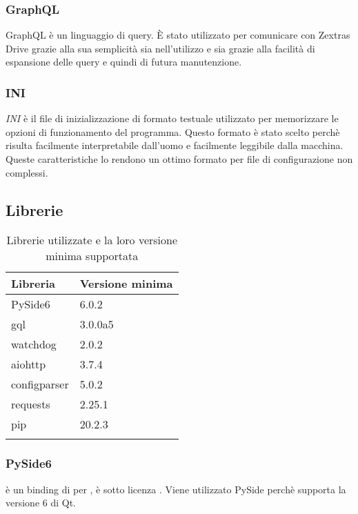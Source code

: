 {\subsubsection{GraphQL}
GraphQL è un linguaggio di query. È stato utilizzato per comunicare con Zextras Drive grazie alla sua semplicità sia nell'utilizzo e sia grazie alla facilità di espansione delle query e quindi di futura manutenzione.
\subsubsection{INI}
\textit{INI} è il file di inizializzazione di formato testuale utilizzato per memorizzare le opzioni di funzionamento del programma. Questo formato è stato scelto perchè risulta facilmente interpretabile dall'uomo e facilmente leggibile dalla macchina. Queste caratteristiche lo rendono un ottimo formato per file di configurazione non complessi.

\subsection{Librerie}

{
	\setlength{\freewidth}{\dimexpr\textwidth-1\tabcolsep}
	\renewcommand{\arraystretch}{1.5}
	\setlength{\aboverulesep}{0pt}
	\setlength{\belowrulesep}{0pt}
	\begin{longtable}{L{.210\freewidth} L{.68\freewidth}}
		\textbf{Libreria} & \textbf{Versione minima} \\
		\toprule
		\endhead		
		PySide6 & 6.0.2 \\
		gql&3.0.0a5 \\
		watchdog&2.0.2 \\
		aiohttp&3.7.4 \\
		configparser&5.0.2 \\
		requests&2.25.1	 \\
		pip&20.2.3\\
				
		\bottomrule
		\hiderowcolors
		\caption{Librerie utilizzate e la loro versione minima supportata}
	\end{longtable}
	
\subsubsection{PySide6}
 è un binding di  per , è sotto licenza . Viene utilizzato PySide perchè supporta la versione 6 di Qt.
}}
